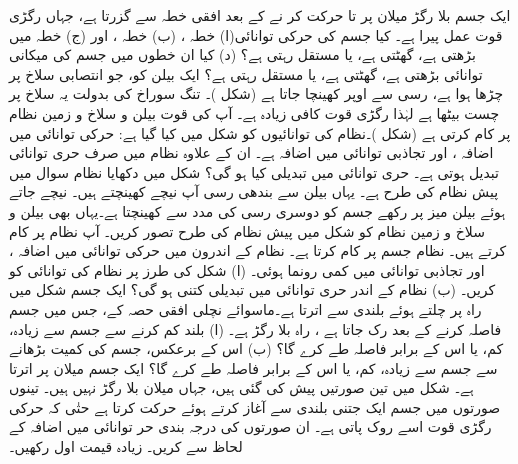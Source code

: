 ایک جسم  بلا رگڑ  میلان  پر  تا  حرکت کر نے کے بعد افقی خطہ  سے گزرتا ہے، جہاں رگڑی قوت عمل پیرا ہے۔ کیا جسم کی حرکی توانائی(ا)  خطہ  ، (ب) خطہ ، اور (ج) خطہ   میں بڑھتی ہے، گھٹتی ہے، یا  مستقل رہتی ہے؟ (د) کیا ان خطوں میں جسم کی میکانی توانائی بڑھتی ہے، گھٹتی ہے، یا مستقل رہتی ہے؟
ایک  بیلن کو،   جو  انتصابی  سلاخ  پر  چڑھا ہوا  ہے، رسی  سے اوپر کھینچا جاتا ہے (شکل )۔   تنگ  سوراخ  کی بدولت یہ سلاخ پر چست بیٹھا ہے لہٰذا  رگڑی قوت کافی زیادہ   ہے۔ آپ کی قوت بیلن و سلاخ و زمین نظام پر  کام کرتی ہے (شکل )۔نظام کی توانائیوں کو   شکل  میں    کیا گیا ہے: حرکی توانائی   میں اضافہ ،  اور تجاذبی توانائی   میں اضافہ  ہے۔ ان کے علاوہ نظام میں صرف حری توانائی   تبدیل ہوتی ہے۔ حری توانائی میں تبدیلی  کیا ہو گی؟
شکل  میں   دکھایا نظام   سوال   میں پیش نظام کی طرح ہے۔ یہاں  بیلن سے بندھی   رسی آپ نیچے کھینچتے ہیں۔  نیچے جاتے ہوئے بیلن میز پر رکھے جسم کو دوسری رسی کی مدد سے کھینچتا ہے۔یہاں بھی بیلن و  سلاخ و زمین نظام کو  شکل  میں پیش نظام کی طرح تصور کریں۔ آپ نظام پر  کام کرتے ہیں۔ نظام جسم پر  کام کرتا ہے۔ نظام کے اندرون میں حرکی توانائی میں  اضافہ ، اور تجاذبی توانائی میں  کمی رونما ہوئی۔ (ا)  شکل  کی طرز پر نظام کی توانائی کو  کریں۔ (ب) نظام کے اندر حری توانائی میں تبدیلی کتنی ہو گی؟
ایک جسم شکل  میں  راہ پر چلتے ہوئے   بلندی سے اترتا ہے۔ماسوائے نچلی افقی حصہ  کے،  جس میں جسم  فاصلہ  کرنے کے بعد رک جاتا ہے ،   راہ بلا رگڑ ہے۔ (ا)  بلند  کم کرنے سے جسم  سے زیادہ، کم، یا اس کے  برابر فاصلہ طے کرے گا؟ (ب) اس کے برعکس، جسم کی کمیت بڑھانے سے جسم  سے زیادہ، کم، یا اس کے برابر فاصلہ طے کرے گا؟
ایک جسم میلان پر اترتا ہے۔ شکل  میں تین صورتیں پیش کی گئی ہیں، جہاں میلان بلا رگڑ نہیں ہیں۔ تینوں صورتوں میں جسم ایک جتنی بلندی سے آغاز کرتے ہوئے حرکت کرتا ہے حتٰی کہ  حرکی رگڑی قوت اسے روک پاتی ہے۔ ان صورتوں کی درجہ بندی حر توانائی میں اضافہ کے لحاظ سے کریں۔ زیادہ قیمت اول رکھیں۔
